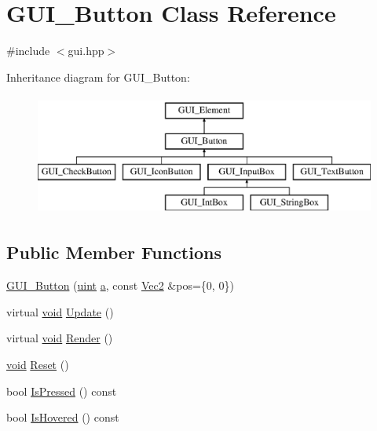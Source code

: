 \hypertarget{class_g_u_i___button}{\section{G\-U\-I\-\_\-\-Button Class Reference}
\label{class_g_u_i___button}
}


{\ttfamily \#include $<$gui.\-hpp$>$}

Inheritance diagram for G\-U\-I\-\_\-\-Button\-:\begin{figure}[H]
\begin{center}
\leavevmode
\includegraphics[height=4.000000cm]{class_g_u_i___button}
\end{center}
\end{figure}
\subsection*{Public Member Functions}
\begin{DoxyCompactItemize}
\item 
\hyperlink{class_g_u_i___button_a9cd30051f98c0c69fa8eec60799d4ce9}{G\-U\-I\-\_\-\-Button} (\hyperlink{common_8hpp_a69aa29b598b851b0640aa225a9e5d61d}{uint} \hyperlink{_s_d_l__opengl__glext_8h_a3309789fc188587d666cda5ece79cf82}{a}, const \hyperlink{class_vec2}{Vec2} \&pos=\{0, 0\})
\item 
virtual \hyperlink{_s_d_l__opengles2__gl2ext_8h_ae5d8fa23ad07c48bb609509eae494c95}{void} \hyperlink{class_g_u_i___button_af6077aeadc072ce43b58f011abc1f2e8}{Update} ()
\item 
virtual \hyperlink{_s_d_l__opengles2__gl2ext_8h_ae5d8fa23ad07c48bb609509eae494c95}{void} \hyperlink{class_g_u_i___button_a4e9d35cd3b54d0888a86704f6c02f297}{Render} ()
\item 
\hyperlink{_s_d_l__opengles2__gl2ext_8h_ae5d8fa23ad07c48bb609509eae494c95}{void} \hyperlink{class_g_u_i___button_ad1fc708e75351f2d754e89d4d8960a9f}{Reset} ()
\item 
bool \hyperlink{class_g_u_i___button_ab7170fbf07cb403832a8c49f3d2b0bdc}{Is\-Pressed} () const 
\item 
bool \hyperlink{class_g_u_i___button_a36e96c1d03a9d74ef583a9fa153d4051}{Is\-Hovered} () const 
\end{DoxyCompactItemize}
